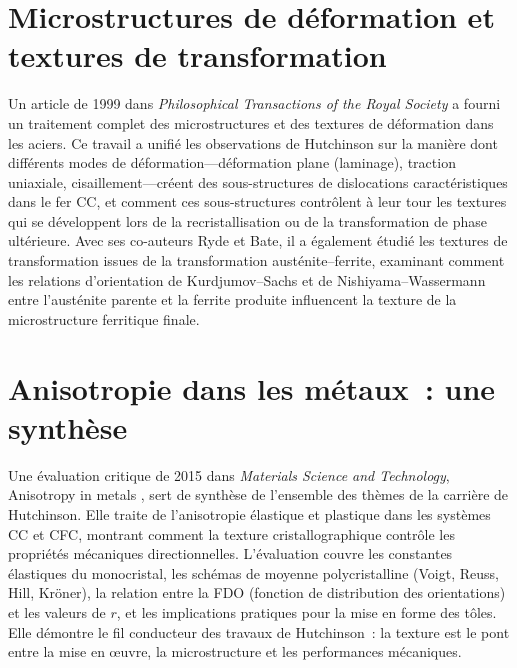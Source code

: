 \documentclass[11pt,a4paper]{article}
\begin{document}
\section{Microstructures de d\'eformation et textures de transformation}
\label{sec:deformation}

Un article de 1999 dans \emph{Philosophical Transactions of the Royal
Society} \cite{Hutchinson1999Phil} a fourni un traitement complet des
microstructures et des textures de d\'eformation dans les aciers.  Ce
travail a unifi\'e les observations de Hutchinson sur la mani\`ere dont
diff\'erents modes de d\'eformation---d\'eformation plane (laminage),
traction uniaxiale, cisaillement---cr\'eent des sous-structures de
dislocations caract\'eristiques dans le fer CC, et comment ces
sous-structures contr\^olent \`a leur tour les textures qui se
d\'eveloppent lors de la recristallisation ou de la transformation de
phase ult\'erieure.  Avec ses co-auteurs Ryde et Bate, il a \'egalement
\'etudi\'e les textures de transformation issues de la transformation
aust\'enite--ferrite, examinant comment les relations d'orientation de
Kurdjumov--Sachs et de Nishiyama--Wassermann entre l'aust\'enite
parente et la ferrite produite influencent la texture de la
microstructure ferritique finale.

\section{Anisotropie dans les m\'etaux~: une synth\`ese}
\label{sec:anisotropy}

Une \'evaluation critique de 2015 dans \emph{Materials Science and
Technology}, \og Anisotropy in metals \fg{} \cite{Hutchinson2015}, sert
de synth\`ese de l'ensemble des th\`emes de la carri\`ere de Hutchinson.
Elle traite de l'anisotropie \'elastique et plastique dans les
syst\`emes CC et CFC, montrant comment la texture cristallographique
contr\^ole les propri\'et\'es m\'ecaniques directionnelles.
L'\'evaluation couvre les constantes \'elastiques du monocristal, les
sch\'emas de moyenne polycristalline (Voigt, Reuss, Hill, Kr\"oner), la
relation entre la FDO (fonction de distribution des orientations) et les
valeurs de $r$, et les implications pratiques pour la mise en forme des
t\^oles.  Elle d\'emontre le fil conducteur des travaux de Hutchinson~:
la texture est le pont entre la mise en \oe uvre, la microstructure et
les performances m\'ecaniques.
\end{document}
